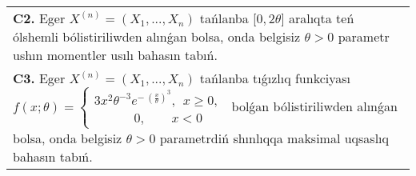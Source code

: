 \documentclass{article}
\begin{document}
\begin{tabular}{m{17cm}}
 \\
\textbf{C2.} 
Eger \(X^{(n)} = \left( X_{1},...,X_{n} \right)\) tańlanba {[}\(0,2\theta\rbrack\) aralıqta teń ólshemli bólistiriliwden alınǵan bolsa, onda belgisiz \(\theta > 0\) parametr ushın momentler usılı bahasın tabıń.
 \\
\textbf{C3.} 
Eger \(X^{(n)} = \left( X_{1},...,X_{n} \right)\) tańlanba tıǵızlıq funkciyası
$f(x;\theta) = \left\{ \begin{matrix}
3x^{2}\theta^{- 3}e^{- \ \left( \frac{x}{\theta} \right)^{3}},\ \ x \geq 0, \\
\ \ \ \ \ \ \ \ \ \ \ \ \ \ 0,\ \ \ \ \ \ \ \ \ x < 0
\end{matrix} \right.\ $
bolǵan bólistiriliwden alınǵan bolsa, onda belgisiz \(\theta > 0\) parametrdiń shınlıqqa maksimal uqsaslıq bahasın tabıń.
 \\

\end{tabular}
\vspace{1cm}
\end{document}
